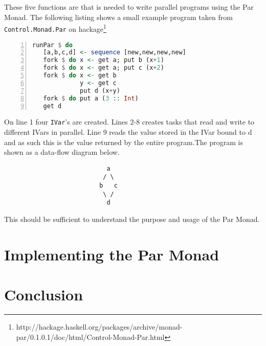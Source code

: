 \documentclass[a4paper, oneside, final]{article}
\begin{document}
These five functions are that is needed to write parallel programs using the Par Monad. The following listing shows a small example program taken from \texttt{Control.Monad.Par} on hackage\footnote{http://hackage.haskell.org/packages/archive/monad-par/0.1.0.1/doc/html/Control-Monad-Par.html} \newline

\begin{lstlisting}[language=Haskell, frame=tb, basicstyle=\footnotesize, numbers=left, numberstyle=\tiny]
runPar $ do
   [a,b,c,d] <- sequence [new,new,new,new]
   fork $ do x <- get a; put b (x+1)
   fork $ do x <- get a; put c (x+2)
   fork $ do x <- get b
             y <- get c 
             put d (x+y)
   fork $ do put a (3 :: Int)
   get d
\end{lstlisting}

On line 1 four \texttt{IVar}'s are created. Lines 2-8 creates tasks that read and write to different IVars in parallel. Line 9 reads the value stored in the IVar bound to d and as such this is the value returned by the entire program.The program is shown as a data-flow diagram below.

\begin{lstlisting}
                            a
                           / \  
                          b   c
                           \ /
                            d
\end{lstlisting}

This should be sufficient to understand the purpose and usage of the Par Monad.

\section{Implementing the Par Monad}

\section{Conclusion}


\end{document}
